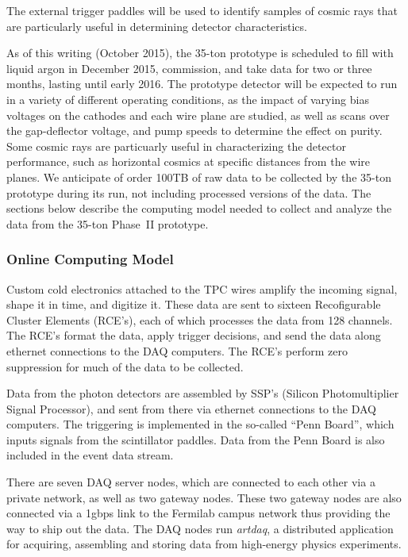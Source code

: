 The external trigger paddles will be used to identify samples of cosmic rays that are particularly useful in determining
detector characteristics.

As of this writing (October 2015), the 35-ton prototype is scheduled to fill with liquid argon
in December 2015, commission, and take data for two or three months, lasting until early 2016.
The prototype detector will be expected to run in a variety of different operating conditions, as
the impact of varying bias voltages on the cathodes and each wire plane are studied, as well as
scans over the gap-deflector voltage, and pump speeds to determine the effect on purity.  Some cosmic
rays are particuarly useful in characterizing the detector performance, such as horizontal cosmics
at specific distances from the wire planes.  We anticipate of order 100TB of raw data to be collected
by the 35-ton prototype during its run, not including processed versions of the data.
The sections below describe the computing model needed
to collect and analyze the data from the 35-ton Phase~II prototype.

\subsubsection{Online Computing Model}

Custom cold electronics attached to the TPC wires amplify the incoming signal, shape it in time,
and digitize it.  These data are sent to sixteen Recofigurable Cluster Elements (RCE's), each of which
processes the data from 128 channels.  The RCE's format the data, apply trigger decisions, and send the
data along ethernet connections to the DAQ computers.  The RCE's perform zero suppression for
much of the data to be collected.


Data from the photon detectors are assembled
by SSP's (Silicon Photomultiplier Signal Processor), and sent from there via ethernet connections to the DAQ computers.  The
triggering is implemented in the so-called ``Penn Board'', which inputs signals from the scintillator paddles.  Data
from the Penn Board is also included in the event data stream.

There are seven DAQ server nodes, which are connected to each other via a private network, as well as two gateway nodes. 
These two gateway nodes are also connected via a 1gbps link to the Fermilab campus network thus providing the way
to ship out the data. The DAQ nodes run {\it artdaq}, a distributed application for acquiring, assembling and storing data from high-energy
physics experiments. 

